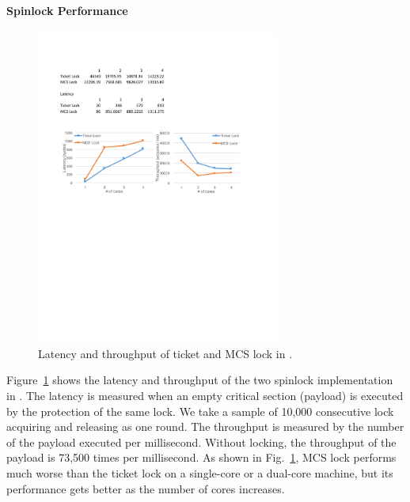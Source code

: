 \vspace{-3pt}
\paragraph{Spinlock Performance}
\begin{figure}
	\begin{center}
		\vspace{-.2cm}
		\hspace{-.2cm}
		\includegraphics[width=8cm]{figs/locks.pdf}
		\hspace{-.2cm}
		\vspace{.0cm}
\vspace{-5pt}
		\caption{Latency and throughput of ticket and MCS lock in \mCTOS{}.}
		\label{fig:eval_spin}
	\end{center}
		\vspace{-10pt}
\end{figure}

Figure~\ref{fig:eval_spin} shows the latency and throughput of the two
spinlock implementation in \mCTOS. The latency is measured when an
empty critical section (payload) is executed by the protection of the
same lock. We take a sample of 10,000 consecutive lock acquiring and
releasing as one round.  The throughput is measured by the
number of the payload executed per millisecond. Without locking, the
throughput of the payload is 73,500 times per millisecond.  As shown
in Fig.~\ref{fig:eval_spin}, MCS lock performs much worse than the
ticket lock on a single-core or a dual-core machine, but its
performance gets better as the number of cores increases.


